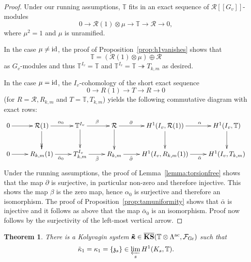 \documentclass[12pt]{amsart}
\numberwithin{equation}{section}
\newtheorem{thm}{Theorem}[section]
\begin{document}
\begin{proof}
Under our running assumptions, ${\mathbb{T}}$ fits in an exact sequence of ${\mathcal{R}}[[G_v]]$-modules
$$0{\longrightarrow} {\mathcal{R}}(1)\otimes\mu {\longrightarrow} {\mathbb{T}} {\longrightarrow} {\mathcal{R}}{\longrightarrow} 0,$$
where $\mu^2=1$ and $\mu$ is unramified.

In the case $\mu\neq\textup{id}$, the proof of Proposition~\ref{prop:h1vanishes} shows that
$${\mathbb{T}}=({\mathcal{R}}(1)\otimes\mu)\oplus{\mathcal{R}}$$
as $G_v$-modules and thus ${\mathbb{T}}^{I_v}={\mathbb{T}}$ and ${\mathbb{T}}^{I_v}={\mathbb{T}} \twoheadrightarrow T_{k,m}$ as desired.

In the case $\mu=\textup{id}$, the $I_v$-cohomology of the short exact sequence
$$0{\longrightarrow} R(1){\longrightarrow} T {\longrightarrow} R {\longrightarrow} 0$$
(for $R={\mathcal{R}},R_{k,m}$ and $T={\mathbb{T}},T_{k,m}$) yields the following commutative diagram with exact rows:
$$
\xymatrix{0\ar[r]&{\mathcal{R}}(1)\ar@{->>}[d]\ar[r]^{\alpha_0}&{\mathbb{T}}^{I_v}\ar[r]^{\beta}\ar[d]&{\mathcal{R}}\ar[d]\ar[r]^(.33){\partial}&H^1(I_v,{\mathcal{R}}(1))\ar[d]\ar[r]^(.56){\alpha}&H^1(I_v,{\mathbb{T}})\ar[d]\\
0\ar[r]&R_{k,m}(1)\ar[r]_{\bar{\alpha}_0}&T_{k,m}^{I_v}\ar[r]_{\bar{\beta}}&R_{k,m}\ar[r]_(.33){\bar{\partial}}&H^1(I_v,R_{k,m}(1))\ar[r]_(.56){\bar{\alpha}}&H^1(I_v,T_{k,m})}$$
Under the running assumptions, the proof of Lemma~\ref{lemma:torsionfree} shows that the map $\partial$ is surjective, in particular non-zero and therefore injective. This shows the map $\beta$ is the zero map, hence $\alpha_0$ is surjective and therefore an isomorphism. The proof of Proposition~\ref{prop:tamuniformity} shows that $\bar{\alpha}$ is injective and it follows as above that the map $\bar{\alpha}_0$ is an isomorphism. Proof now follows by the surjectivity of the left-most vertical arrow.
\end{proof}

\begin{thm}
\label{thm:KS}
There is a Kolyvagin system $\pmb{\tilde{\kappa}} \in \overline{\textup{\textbf{KS}}}({\mathbb{T}}\otimes{\Lambda}^{\textup{ac}},{\mathcal{F}}_{\textup{Gr}})$ such that 
$$\tilde{\kappa}_1=\kappa_1=\{\frak{z}_s\} \in \varprojlim_s H^1(K_s,{\mathbb{T}}).$$
\end{thm}
\end{document}
